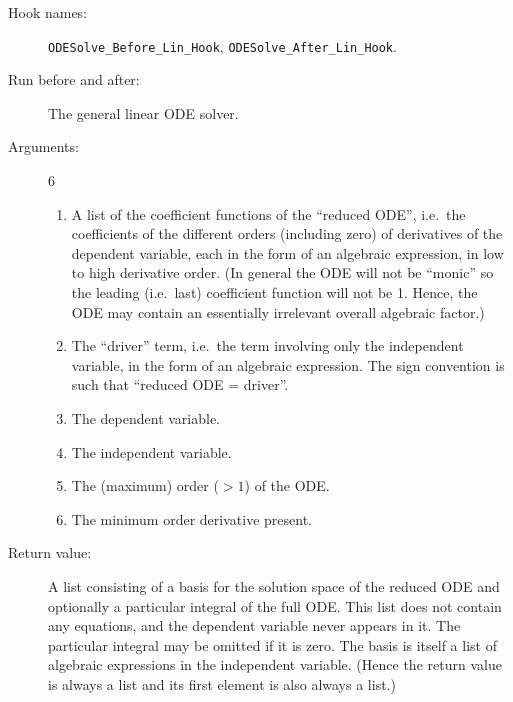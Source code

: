 \begin{description}
\item[Hook names:] \texttt{ODESolve\_Before\_Lin\_Hook},
\texttt{ODESolve\_After\_Lin\_Hook}.
\item[Run before and after:] The general linear ODE solver.
\item[Arguments:] 6
\begin{enumerate}
\item A list of the coefficient functions of the ``reduced ODE'',
i.e.\ the coefficients of the different orders (including zero) of
derivatives of the dependent variable, each in the form of an
algebraic expression, in low to high derivative order.  (In general
the ODE will not be ``monic'' so the leading (i.e.\ last) coefficient
function will not be 1.  Hence, the ODE may contain an essentially
irrelevant overall algebraic factor.)
\item The ``driver'' term, i.e.\ the term involving only the
independent variable, in the form of an algebraic expression.  The
sign convention is such that ``reduced ODE = driver''.
\item The dependent variable.
\item The independent variable.
\item The (maximum) order ($> 1$) of the ODE.
\item The minimum order derivative present.
\end{enumerate}
\item[Return value:] A list consisting of a basis for the solution
space of the reduced ODE and optionally a particular integral of the
full ODE\@.  This list does not contain any equations, and the dependent
variable never appears in it.  The particular integral may be omitted
if it is zero.  The basis is itself a list of algebraic expressions in
the independent variable.  (Hence the return value is always a list
and its first element is also always a list.)
\end{description}

\noindent\hrulefill

